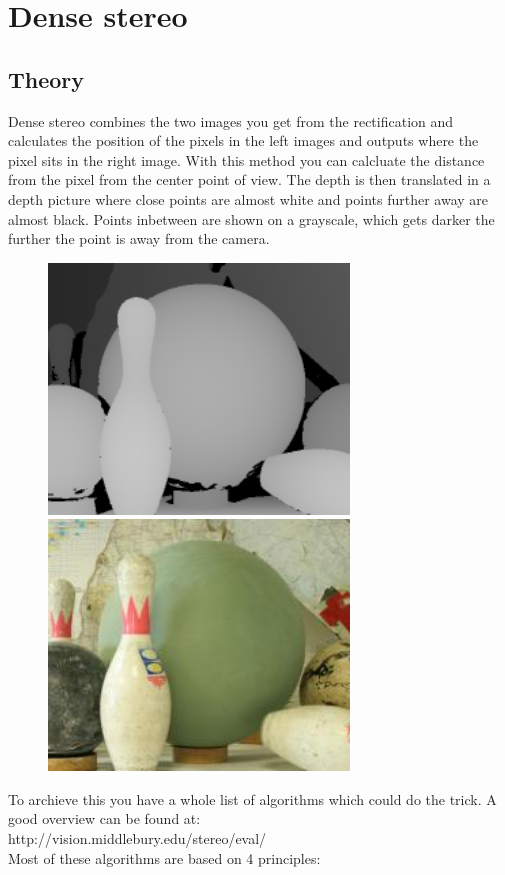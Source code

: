 \documentclass[12pt,draft,a4paper]{article}
\begin{document}
\section{Dense stereo}
\subsection{Theory}
Dense stereo combines the two images you get from the rectification
and calculates the position of the pixels in the left images and
outputs where the pixel sits in the right  image. With this method you
can calcluate the distance from the pixel from the center point of
view. The depth is then translated in a depth picture where close
points are almost white and points further away are almost
black. Points inbetween are shown on a grayscale, which gets darker
 the further the point is away from the camera.\\

\begin{figure}
\includegraphics[width=8cm]{depthmap}
\includegraphics[width=8cm]{depthmap_original}
\end{figure}

To archieve this you have a whole list of algorithms which could do
the trick. A good overview can be found at: \\
http://vision.middlebury.edu/stereo/eval/ \\
Most of these algorithms are based on 4 principles: 
\end{document}
